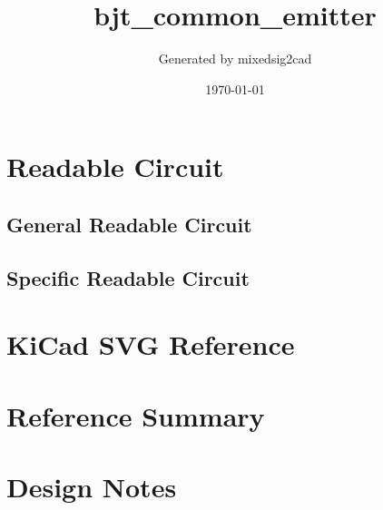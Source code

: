 \documentclass[11pt]{article}
\title{bjt\_common\_emitter}
\author{Generated by mixedsig2cad}
\date{\today}
\begin{document}
\maketitle
\section{Readable Circuit}
\subsection{General Readable Circuit}

\subsection{Specific Readable Circuit}

\section{KiCad SVG Reference}
\section{Reference Summary}

\section{Design Notes}

\end{document}
